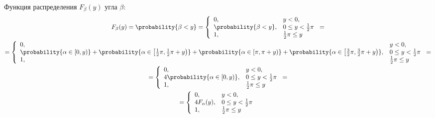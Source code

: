 Функция распределения $F_\beta(y)$ угла $\beta$:
\begin{multline}
    F_\beta(y) = \probability{\beta < y}
    = \left \{
    \begin{array}{ll}
        0 ,                      & y < 0,                    \\
        \probability{\beta < y}, & 0 \le y < \frac{1}{2} \pi \\
        1,                       & \frac{1}{2} \pi \leq y
    \end{array}
    \right . = \\
    = \left \{
    \begin{array}{ll}
        0 ,                                                                                                                                                                                                                                                                        & y < 0,                    \\
        \probability{\alpha \in \left [ 0, y \right )} + \probability{\alpha \in \left [ \frac{1}{2} \pi, \frac{1}{2} \pi + y \right )} + \probability{\alpha \in \left [ \pi, \pi + y \right )} + \probability{\alpha \in \left [ \frac{3}{2} \pi, \frac{3}{2} \pi + y \right )}, & 0 \le y < \frac{1}{2} \pi \\
        1,                                                                                                                                                                                                                                                                         & \frac{1}{2} \pi \leq y
    \end{array}
    \right . = \\
    = \left \{
    \begin{array}{ll}
        0 ,                                               & y < 0,                    \\
        4 \probability{\alpha \in \left [ 0, y \right )}, & 0 \le y < \frac{1}{2} \pi \\
        1,                                                & \frac{1}{2} \pi \leq y
    \end{array}
    \right . = \\
    = \left \{
    \begin{array}{ll}
        0 ,            & y < 0,                    \\
        4 F_\alpha(y), & 0 \le y < \frac{1}{2} \pi \\
        1,             & \frac{1}{2} \pi \leq y
    \end{array}
    \right .
\end{multline}
